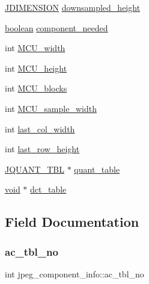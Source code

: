 \begin{DoxyCompactItemize}
\item 
\hyperlink{jmorecfg_8h_a04ed4674f6f1d0d50ec241531e38274f}{J\+D\+I\+M\+E\+N\+S\+I\+ON} \hyperlink{structjpeg__component__info_a019811f4bcc16fe481e0b53f659b281e}{downsampled\+\_\+height}
\item 
\hyperlink{jconfig_8h_a7670a4e8a07d9ebb00411948b0bbf86d}{boolean} \hyperlink{structjpeg__component__info_a8f9efa098849cd087e20d536b05d4798}{component\+\_\+needed}
\item 
int \hyperlink{structjpeg__component__info_a82a5bababd81410839aefec8a61878de}{M\+C\+U\+\_\+width}
\item 
int \hyperlink{structjpeg__component__info_a09baec129e44114d46d5b19dc98b0105}{M\+C\+U\+\_\+height}
\item 
int \hyperlink{structjpeg__component__info_ad9b901306395808c7eb338148e30c2cd}{M\+C\+U\+\_\+blocks}
\item 
int \hyperlink{structjpeg__component__info_aca7e52dcd78bb2fe51104e2add9dade5}{M\+C\+U\+\_\+sample\+\_\+width}
\item 
int \hyperlink{structjpeg__component__info_a440612272e3e9eac0a240fd34cde5bbe}{last\+\_\+col\+\_\+width}
\item 
int \hyperlink{structjpeg__component__info_a7d0738ae3647a019722410a2d718f3d3}{last\+\_\+row\+\_\+height}
\item 
\hyperlink{struct_j_q_u_a_n_t___t_b_l}{J\+Q\+U\+A\+N\+T\+\_\+\+T\+BL} $\ast$ \hyperlink{structjpeg__component__info_afd551e8e9dbc3f3076c10cd4d391fdac}{quant\+\_\+table}
\item 
\hyperlink{png_8h_ac9c84fa68bbad002983e35ce3663c686}{void} $\ast$ \hyperlink{structjpeg__component__info_a9f68a39fc17561866668c1b9d4a8f238}{dct\+\_\+table}
\end{DoxyCompactItemize}


\subsection{Field Documentation}
\mbox{\label{structjpeg__component__info_adfea67573a39b232c3d82ac808539a83}} 
\subsubsection{\texorpdfstring{ac\+\_\+tbl\+\_\+no}{ac\_tbl\_no}}
{\footnotesize\ttfamily int jpeg\+\_\+component\+\_\+info\+::ac\+\_\+tbl\+\_\+no}

